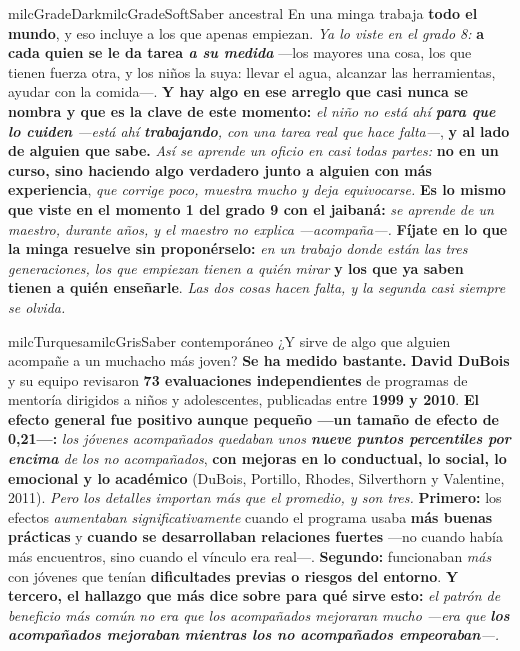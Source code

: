 \documentclass[11pt,letterpaper]{article}
\begin{document}
\begin{softbox}{milcGradeDark}{milcGradeSoft}{Saber ancestral}
En una minga trabaja \textbf{todo el mundo}, y eso incluye a los que apenas empiezan. \emph{Ya lo viste en el grado 8:} \textbf{a cada quien se le da tarea \emph{a su medida}} ---los mayores una cosa, los que tienen fuerza otra, y los niños la suya: llevar el agua, alcanzar las herramientas, ayudar con la comida---. \textbf{Y hay algo en ese arreglo que casi nunca se nombra y que es la clave de este momento:} \emph{el niño no está ahí \textbf{para que lo cuiden} ---está ahí \textbf{trabajando}, con una tarea real que hace falta---}, \textbf{y al lado de alguien que sabe.} \emph{Así se aprende un oficio en casi todas partes:} \textbf{no en un curso, sino haciendo algo verdadero junto a alguien con más experiencia}, \emph{que corrige poco, muestra mucho y deja equivocarse.} \textbf{Es lo mismo que viste en el momento 1 del grado 9 con el jaibaná:} \emph{se aprende de un maestro, durante años, y el maestro no explica ---acompaña---.} \textbf{Fíjate en lo que la minga resuelve sin proponérselo:} \emph{en un trabajo donde están las tres generaciones, los que empiezan tienen a quién mirar} \textbf{y los que ya saben tienen a quién enseñarle}. \emph{Las dos cosas hacen falta, y la segunda casi siempre se olvida.}
\end{softbox}

\begin{softbox}{milcTurquesa}{milcGris}{Saber contemporáneo}
¿Y sirve de algo que alguien acompañe a un muchacho más joven? \textbf{Se ha medido bastante.} \textbf{David DuBois} y su equipo revisaron \textbf{73 evaluaciones independientes} de programas de mentoría dirigidos a niños y adolescentes, publicadas entre \textbf{1999 y 2010}. \textbf{El efecto general fue positivo aunque pequeño ---un tamaño de efecto de 0,21---:} \emph{los jóvenes acompañados quedaban unos \textbf{nueve puntos percentiles por encima} de los no acompañados}, \textbf{con mejoras en lo conductual, lo social, lo emocional y lo académico} (DuBois, Portillo, Rhodes, Silverthorn y Valentine, 2011). \emph{Pero los detalles importan más que el promedio, y son tres.} \textbf{Primero:} los efectos \emph{aumentaban significativamente} cuando el programa usaba \textbf{más buenas prácticas} y \textbf{cuando se desarrollaban relaciones fuertes} ---no cuando había más encuentros, sino cuando el vínculo era real---. \textbf{Segundo:} funcionaban \emph{más} con jóvenes que tenían \textbf{dificultades previas o riesgos del entorno}. \textbf{Y tercero, el hallazgo que más dice sobre para qué sirve esto:} \emph{el patrón de beneficio más común no era que los acompañados mejoraran mucho ---era que \textbf{los acompañados mejoraban mientras los no acompañados empeoraban}---.}
\end{softbox}
\end{document}
